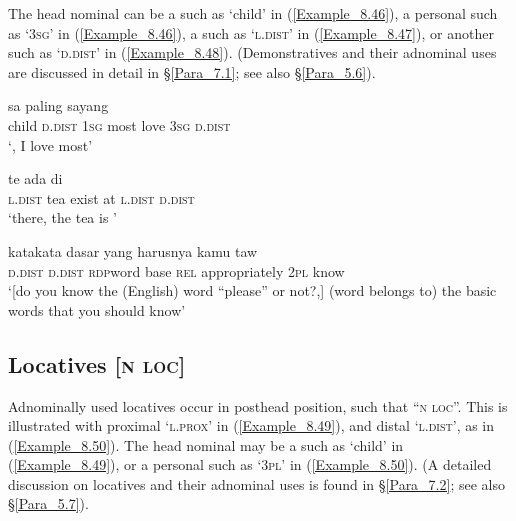 The head nominal can be a  such as  ‘child’ in (\ref{Example_8.46}), a personal  such as  ‘\textsc{3sg}’ in (\ref{Example_8.46}), a  such as  ‘\textsc{l.dist}’ in (\ref{Example_8.47}), or another  such as  ‘\textsc{d.dist}’ in (\ref{Example_8.48}). (Demonstratives and their adnominal uses are discussed in detail in §\ref{Para_7.1}; see also §\ref{Para_5.6}).


\ea
\label{Example_8.46}
 {} {sa} {paling} {sayang} {} {}\\ %
 child  \textsc{d.dist}  \textsc{1sg}  most  love  \textsc{3sg}  \textsc{d.dist}\\
\glt 
‘, I love \bluebold{)} most’ \textstyleExampleSource{[081011-023-Cv.0097]}
\z

\ea
\label{Example_8.47}
 {te} {ada} {di} {} {}\\ %
 \textsc{l.dist}  tea  exist  at  \textsc{l.dist}  \textsc{d.dist}\\
\glt 
‘there, the tea is \bluebold{)}’ \textstyleExampleSource{[081014-011-CvEx.0010]}
\z

\ea
\label{Example_8.48}
\gll {\ldots} {} {} {kata{\Tilde}kata} {dasar} {yang} {harusnya} {kamu} {taw}\\ %
 { }  \textsc{d.dist}  \textsc{d.dist}  \textsc{rdp}{\Tilde}word  base  \textsc{rel}  appropriately  \textsc{2pl}  know\\
 ‘[do you know the (English) word ``please'' or not?,]  (word belongs to) the basic words that you should know’ \textstyleExampleSource{[081115-001a-Cv.0145]}
\z


\subsection{Locatives [\textsc{n} \textsc{loc}]}
\label{Para_8.2.5}
Adnominally used locatives occur in posthead position, such that ``\textsc{n} \textsc{loc}''. This is illustrated with proximal  ‘\textsc{l.prox}’ in (\ref{Example_8.49}), and distal  ‘\textsc{l.dist}’, as in (\ref{Example_8.50}). The head nominal may be a  such as  ‘child’ in (\ref{Example_8.49}), or a personal  such as  ‘\textsc{3pl}’ in (\ref{Example_8.50}). (A detailed discussion on locatives and their adnominal uses is found in §\ref{Para_7.2}; see also §\ref{Para_5.7}).



